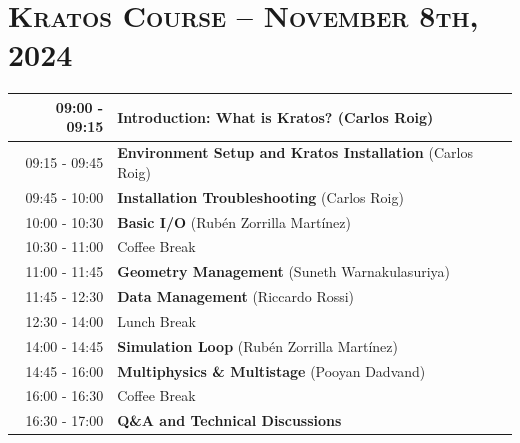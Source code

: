 \documentclass{article}
\begin{document}
\newpage
\section*{\centering \textsc{Kratos Course -- November 8th, 2024}}


\begin{table}[h]\centering
   \begin{tabularx}{0.85\textwidth}{r|X}
      \toprule%
      09:00 - 09:15 & {\large \textbf{Introduction: What is Kratos?}} (Carlos Roig) \\%
      \midrule%
      09:15 - 09:45 & {\large \textbf{Environment Setup and Kratos Installation}} (Carlos Roig) \\%
      \midrule%
      09:45 - 10:00 & {\large \textbf{Installation Troubleshooting}} (Carlos Roig) \\%
      \midrule%
      10:00 - 10:30 & {\large \textbf{Basic I/O}} (Rubén Zorrilla Martínez) \\%
      \midrule%
      \rowcolor{SeaGreen3!5!} 10:30 - 11:00 & Coffee Break \\%
      \midrule%
      11:00 - 11:45 & {\large \textbf{Geometry Management}} (Suneth Warnakulasuriya) \\%
      \midrule%
      11:45 - 12:30 & {\large \textbf{Data Management}} (Riccardo Rossi) \\%
      \midrule%
      \rowcolor{SeaGreen3!5!} 12:30 - 14:00 & Lunch Break \\%
      \midrule%
      14:00 - 14:45 & {\large \textbf{Simulation Loop}} (Rubén Zorrilla Martínez) \\%
      \midrule%
      14:45 - 16:00 & {\large \textbf{Multiphysics \& Multistage}} (Pooyan Dadvand) \\%
      \midrule%
      \rowcolor{SeaGreen3!5!} 16:00 - 16:30 & Coffee Break \\%
      \midrule%
      16:30 - 17:00 & {\large \textbf{Q\&A and Technical Discussions}} \\%
      \bottomrule
   \end{tabularx}
\end{table}
\end{document}
